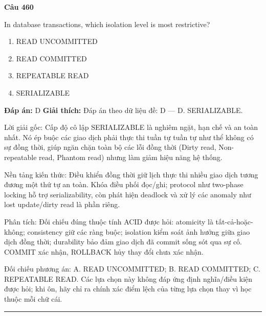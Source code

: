 \documentclass[11pt,a4paper]{article}
\newenvironment{question}[1]{%
  \par\vspace{1em}\noindent\textbf{\large Câu #1}\par\vspace{0.4em}
}{%
  \par\vspace{1em}\hrule\vspace{0.6em}
}
\newenvironment{choices}{%
  \begin{enumerate}[label=\textbf{\Alph*.},leftmargin=2.2em,itemsep=2pt,topsep=3pt]
}{%
  \end{enumerate}
}
\newcommand{\choice}{\item}
\begin{document}
\begin{question}{460}
In database transactions, which isolation level is most restrictive?
\begin{choices}
\choice READ UNCOMMITTED
\choice READ COMMITTED
\choice REPEATABLE READ
\choice SERIALIZABLE
\end{choices}
\textbf{Đáp án:} D
\textbf{Giải thích:} Đáp án theo dữ liệu đề: D — D. SERIALIZABLE.

Lời giải gốc: Cấp độ cô lập SERIALIZABLE là nghiêm ngặt, hạn chế và an toàn nhất. Nó ép buộc các giao dịch phải thực thi tuần tự tuần tự như thể không có sự đồng thời, giúp ngăn chặn toàn bộ các lỗi đồng thời (Dirty read, Non-repeatable read, Phantom read) nhưng làm giảm hiệu năng hệ thống.

Nền tảng kiến thức: Điều khiển đồng thời giữ lịch thực thi nhiều giao dịch tương đương một thứ tự an toàn. Khóa điều phối đọc/ghi; protocol như two-phase locking hỗ trợ serializability, còn phát hiện deadlock và xử lý các anomaly như lost update/dirty read là phần riêng.

Phân tích: Đối chiếu đúng thuộc tính ACID được hỏi: atomicity là tất-cả-hoặc-không; consistency giữ các ràng buộc; isolation kiểm soát ảnh hưởng giữa giao dịch đồng thời; durability bảo đảm giao dịch đã commit sống sót qua sự cố. COMMIT xác nhận, ROLLBACK hủy thay đổi chưa xác nhận.

Đối chiếu phương án: A. READ UNCOMMITTED; B. READ COMMITTED; C. REPEATABLE READ. Các lựa chọn này không đáp ứng định nghĩa/điều kiện được hỏi; khi ôn, hãy chỉ ra chính xác điểm lệch của từng lựa chọn thay vì học thuộc mỗi chữ cái.
\end{question}
\end{document}
